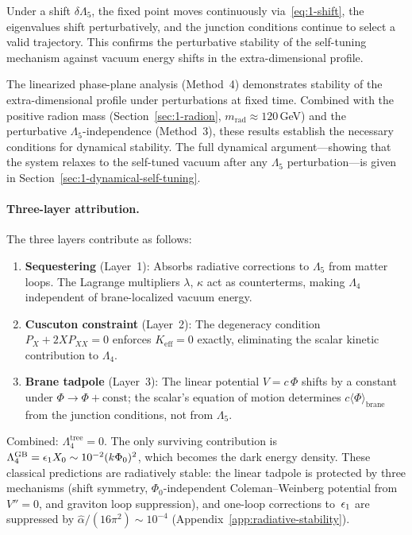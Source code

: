Under a shift $\delta\Lambda_5$, the fixed point moves continuously via~\eqref{eq:1-shift}, the eigenvalues shift perturbatively, and the junction conditions continue to select a valid trajectory. This confirms the perturbative stability of the self-tuning mechanism against vacuum energy shifts in the extra-dimensional profile.

\begin{remark}
\label{rem:1-stability-scope}
The linearized phase-plane analysis (Method~4) demonstrates stability of the extra-dimensional profile under perturbations at fixed time. Combined with the positive radion mass (Section~\ref{sec:1-radion}, $m_{\mathrm{rad}} \approx 120\,$GeV) and the perturbative $\Lambda_5$-independence (Method~3), these results establish the necessary conditions for dynamical stability. The full dynamical argument---showing that the system relaxes to the self-tuned vacuum after any $\Lambda_5$ perturbation---is given in Section~\ref{sec:1-dynamical-self-tuning}.
\end{remark}

\paragraph{Three-layer attribution.} The three layers contribute as follows:
\begin{enumerate}
\item \textbf{Sequestering} (Layer~1): Absorbs radiative corrections to $\Lambda_5$ from matter loops. The Lagrange multipliers $\lambda$, $\kappa$ act as counterterms, making $\Lambda_4$ independent of brane-localized vacuum energy.
\item \textbf{Cuscuton constraint} (Layer~2): The degeneracy condition $P_X + 2X P_{XX} = 0$ enforces $K_{\mathrm{eff}} = 0$ exactly, eliminating the scalar kinetic contribution to $\Lambda_4$.
\item \textbf{Brane tadpole} (Layer~3): The linear potential $V = c\,\Phi$ shifts by a constant under $\Phi \to \Phi + \mathrm{const}$; the scalar's equation of motion determines $c\langle\Phi\rangle_{\mathrm{brane}}$ from the junction conditions, not from $\Lambda_5$.
\end{enumerate}
\noindent Combined: $\Lambda_4^{\mathrm{tree}} = 0$. The only surviving contribution is $\Lambda_4^{\mathrm{GB}} = \epsilon_1 X_0 \sim 10^{-2}(k\Phi_0)^2$, which becomes the dark energy density. These classical predictions are radiatively stable: the linear tadpole is protected by three mechanisms (shift symmetry, $\Phi_0$-independent Coleman--Weinberg potential from $V'' = 0$, and graviton loop suppression), and one-loop corrections to~$\epsilon_1$ are suppressed by $\hat{\alpha}/(16\pi^2) \sim 10^{-4}$ (Appendix~\ref{app:radiative-stability}).


